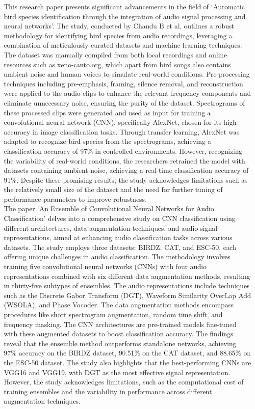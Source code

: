 This research paper presents significant advancements in the field of
`Automatic bird species identification through the integration of audio signal
processing and neural networks'. The study, conducted by Chandu B et al. outlines a robust methodology for identifying bird
species from audio recordings, leveraging a combination of meticulously curated
datasets and  machine learning techniques. The dataset was manually compiled from both local recordings and
online resources such as xeno-canto.org, which apart from bird songs also contains ambient noise and
human voices to simulate real-world conditions. Pre-processing techniques
including pre-emphasis, framing, silence removal, and reconstruction were
applied to the audio clips to enhance the relevant frequency components and
eliminate unnecessary noise, ensuring the purity of the dataset. Spectrograms
of these processed clips were generated and used as input for training a
convolutional neural network (CNN), specifically AlexNet, chosen for its high
accuracy in image classification tasks. Through transfer learning, AlexNet was
adapted to recognize bird species from the spectrograms, achieving a
classification accuracy of 97\% in controlled environments. However,
recognizing the variability of real-world conditions, the researchers retrained
the model with datasets containing ambient noise, achieving a real-time
classification accuracy of 91\%. Despite these promising results, the study
acknowledges limitations such as the relatively small size of the dataset and
the need for further tuning of performance parameters to improve robustness\cite{chandu2020automated}.\\

The paper `An Ensemble of Convolutional Neural Networks for Audio
Classification' delves into a comprehensive study on CNN classification using
different architectures, data augmentation techniques, and audio signal
representations, aimed at enhancing audio classification tasks across various
datasets. The study employs three datasets: BIRDZ, CAT, and ESC-50, each
offering unique challenges in audio classification. The methodology involves
training five convolutional neural networks (CNNs) with four audio
representations combined with six different data augmentation methods,
resulting in thirty-five subtypes of ensembles. The audio representations
include techniques such as the Discrete Gabor Transform (DGT), Waveform
Similarity OverLap Add (WSOLA), and Phase Vocoder. The data augmentation
methods encompass procedures like short spectrogram augmentation, random time
shift, and frequency masking. The CNN architectures are pre-trained models
fine-tuned with these augmented datasets to boost classification accuracy. The
findings reveal that the ensemble method outperforms standalone networks,
achieving 97\% accuracy on the BIRDZ dataset, 90.51\% on the CAT dataset, and
88.65\% on the ESC-50 dataset. The study also highlights that the
best-performing CNNs are VGG16 and VGG19, with DGT as the most effective signal
representation. However, the study acknowledges limitations, such as the
computational cost of training ensembles and the variability in performance
across different augmentation techniques\cite{nanni2021ensemble}.\\

